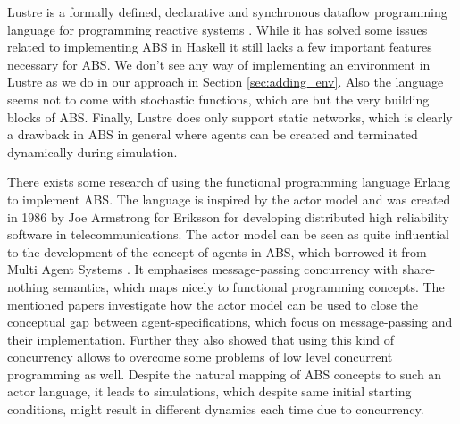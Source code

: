 Lustre is a formally defined, declarative and synchronous dataflow programming language for programming reactive systems \cite{halbwachs_synchronous_1991}. While it has solved some issues related to implementing ABS in Haskell it still lacks a few important features necessary for ABS. We don't see any way of implementing an environment in Lustre as we do in our approach in Section \ref{sec:adding_env}. Also the language seems not to come with stochastic functions, which are but the very building blocks of ABS. Finally, Lustre does only support static networks, which is clearly a drawback in ABS in general where agents can be created and terminated dynamically during simulation.

There exists some research \cite{di_stefano_using_2005, varela_modelling_2004, sher_agent-based_2013} of using the functional programming language Erlang \cite{armstrong_erlang_2010} to implement ABS. The language is inspired by the actor model \cite{agha_actors:_1986} and was created in 1986 by Joe Armstrong for Eriksson for developing distributed high reliability software in telecommunications. The actor model can be seen as quite influential to the development of the concept of agents in ABS, which borrowed it from Multi Agent Systems \cite{wooldridge_introduction_2009}. It emphasises message-passing concurrency with share-nothing semantics, which maps nicely to functional programming concepts. The mentioned papers investigate how the actor model can be used to close the conceptual gap between agent-specifications, which focus on message-passing and their implementation. Further they also showed that using this kind of concurrency allows to overcome some problems of low level concurrent programming as well. Despite the natural mapping of ABS concepts to such an actor language, it leads to simulations, which despite same initial starting conditions, might result in different dynamics each time due to concurrency.